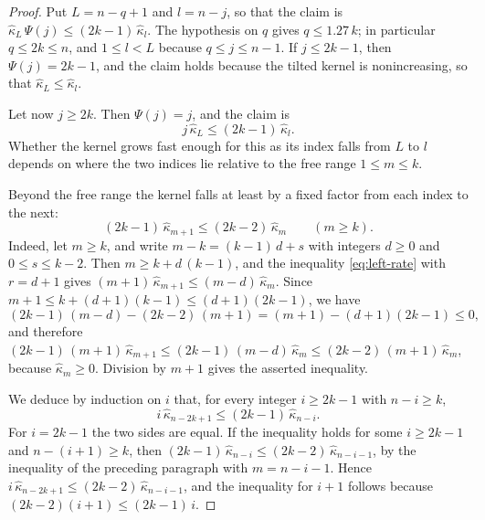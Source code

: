 \documentclass{amsart}
\theoremstyle{definition}
\theoremstyle{remark}
\numberwithin{equation}{section}
\begin{document}
\begin{proof}
Put $L=n-q+1$ and $l=n-j$, so that the claim is $\hat\kappa_L\,\Psi(j)\le(2k-1)\,\hat\kappa_l$. The hypothesis on $q$ gives $q\le 1.27\,k$; in particular $q\le 2k\le n$, and $1\le l<L$ because $q\le j\le n-1$. If $j\le 2k-1$, then $\Psi(j)=2k-1$, and the claim holds because the tilted kernel is nonincreasing, so that $\hat\kappa_L\le\hat\kappa_l$.

Let now $j\ge 2k$. Then $\Psi(j)=j$, and the claim is
\[
j\,\hat\kappa_L\le(2k-1)\,\hat\kappa_l .
\]
Whether the kernel grows fast enough for this as its index falls from $L$ to $l$ depends on where the two indices lie relative to the free range $1\le m\le k$.

Beyond the free range the kernel falls at least by a fixed factor from each index to the next:
\[
(2k-1)\,\hat\kappa_{m+1}\le(2k-2)\,\hat\kappa_m\qquad(m\ge k).
\]
Indeed, let $m\ge k$, and write $m-k=(k-1)\,d+s$ with integers $d\ge 0$ and $0\le s\le k-2$. Then $m\ge k+d\,(k-1)$, and the inequality \eqref{eq:left-rate} with $r=d+1$ gives $(m+1)\,\hat\kappa_{m+1}\le(m-d)\,\hat\kappa_m$. Since $m+1\le k+(d+1)(k-1)\le(d+1)(2k-1)$, we have
\[
(2k-1)\,(m-d)-(2k-2)\,(m+1)=(m+1)-(d+1)(2k-1)\le 0 ,
\]
and therefore $(2k-1)\,(m+1)\,\hat\kappa_{m+1}\le(2k-1)\,(m-d)\,\hat\kappa_m\le(2k-2)\,(m+1)\,\hat\kappa_m$, because $\hat\kappa_m\ge 0$. Division by $m+1$ gives the asserted inequality.

We deduce by induction on $i$ that, for every integer $i\ge 2k-1$ with $n-i\ge k$,
\begin{equation}\label{eq:left-beyond}
i\,\hat\kappa_{n-2k+1}\le(2k-1)\,\hat\kappa_{n-i}.
\end{equation}
For $i=2k-1$ the two sides are equal. If the inequality holds for some $i\ge 2k-1$ and $n-(i+1)\ge k$, then $(2k-1)\,\hat\kappa_{n-i}\le(2k-2)\,\hat\kappa_{n-i-1}$, by the inequality of the preceding paragraph with $m=n-i-1$. Hence $i\,\hat\kappa_{n-2k+1}\le(2k-2)\,\hat\kappa_{n-i-1}$, and the inequality for $i+1$ follows because $(2k-2)(i+1)\le(2k-1)\,i$.


\end{proof}
\end{document}
